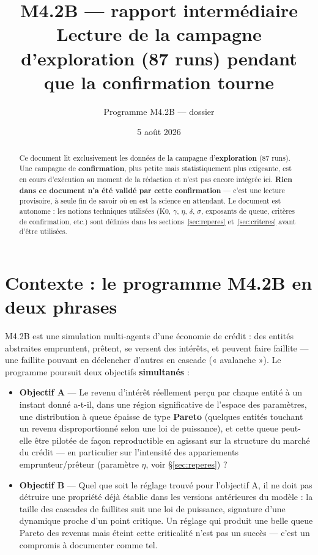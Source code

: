 \documentclass[11pt,a4paper]{article}
\title{M4.2B --- rapport intermédiaire\\
\large Lecture de la campagne d'exploration (87 runs) pendant que la
confirmation tourne}
\author{Programme M4.2B --- dossier \code{m4\_2b\_credit\_soc}}
\date{5 août 2026}
\begin{document}
\maketitle

\begin{abstract}
Ce document lit exclusivement les données de la campagne
d'\textbf{exploration} (87 runs). Une campagne de
\textbf{confirmation}, plus petite mais statistiquement plus exigeante,
est en cours d'exécution au moment de la rédaction et n'est pas encore
intégrée ici. \textbf{Rien dans ce document n'a été validé par cette
confirmation} --- c'est une lecture provisoire, à seule fin de savoir
où en est la science en attendant. Le document est autonome : les
notions techniques utilisées (K0, $\gamma$, $\eta$, $\delta$, $\sigma$,
exposants de queue, critères de confirmation, etc.) sont définies dans
les sections~\ref{sec:reperes} et~\ref{sec:criteres} avant d'être
utilisées.
\end{abstract}

\tableofcontents

\section{Contexte : le programme M4.2B en deux phrases}

M4.2B est une simulation multi-agents d'une économie de crédit : des
entités abstraites empruntent, prêtent, se versent des intérêts, et
peuvent faire faillite --- une faillite pouvant en déclencher d'autres
en cascade (« avalanche »). Le programme poursuit deux objectifs
\textbf{simultanés} :

\begin{itemize}
\item \textbf{Objectif A} --- Le revenu d'intérêt réellement perçu par
  chaque entité à un instant donné a-t-il, dans une région significative
  de l'espace des paramètres, une distribution à queue épaisse de type
  \textbf{Pareto} (quelques entités touchant un revenu disproportionné
  selon une loi de puissance), et cette queue peut-elle être pilotée de
  façon reproductible en agissant sur la structure du marché du
  crédit --- en particulier sur l'intensité des appariements
  emprunteur/prêteur (paramètre $\eta$, voir \S\ref{sec:reperes}) ?
\item \textbf{Objectif B} --- Quel que soit le réglage trouvé pour
  l'objectif A, il ne doit pas détruire une propriété déjà établie dans
  les versions antérieures du modèle : la taille des cascades de
  faillites suit une loi de puissance, signature d'une dynamique proche
  d'un point critique. Un réglage qui produit une belle queue Pareto des
  revenus mais éteint cette criticalité n'est pas un succès --- c'est un
  compromis à documenter comme tel.
\end{itemize}
\end{document}
